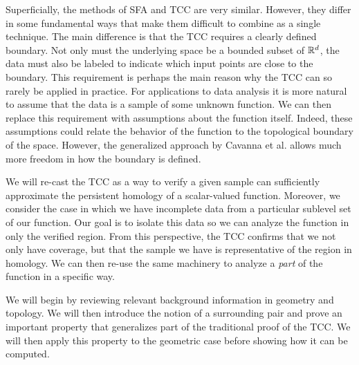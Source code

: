 Superficially, the methods of SFA and TCC are very similar.
However, they differ in some fundamental ways that make them difficult to combine as a single technique.
The main difference is that the TCC requires a clearly defined boundary.
Not only must the underlying space be a bounded subset of $\mathbb{R}^d$, the data must also be labeled to indicate which input points are close to the boundary.
This requirement is perhaps the main reason why the TCC can so rarely be applied in practice.
For applications to data analysis it is more natural to assume that the data is a sample of some unknown function.
We can then replace this requirement with assumptions about the function itself.
Indeed, these assumptions could relate the behavior of the function to the topological boundary of the space.
However, the generalized approach by Cavanna et al. allows much more freedom in how the boundary is defined.

We will re-cast the TCC as a way to verify a given sample can sufficiently approximate the persistent homology of a scalar-valued function.
Moreover, we consider the case in which we have incomplete data from a particular sublevel set of our function.
Our goal is to isolate this data so we can analyze the function in only the verified region.
From this perspective, the TCC confirms that we not only have coverage, but that the sample we have is representative of the region in homology.
We can then re-use the same machinery to analyze a \emph{part} of the function in a specific way.

We will begin by reviewing relevant background information in geometry and topology.
We will then introduce the notion of a surrounding pair and prove an important property that generalizes part of the traditional proof of the TCC.
We will then apply this property to the geometric case before showing how it can be computed.



